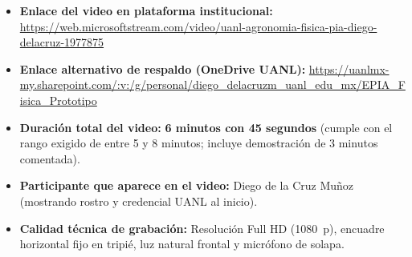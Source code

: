 \begin{tcolorbox}[colback=tableblue,colframe=uanlblue,title=\textbf{Ficha Técnica del Video de Evaluación},breakable]
\begin{itemize}
    \item \textbf{Enlace del video en plataforma institucional:} \newline
    \url{https://web.microsoftstream.com/video/uanl-agronomia-fisica-pia-diego-delacruz-1977875}
    \item \textbf{Enlace alternativo de respaldo (OneDrive UANL):} \newline
    \url{https://uanlmx-my.sharepoint.com/:v:/g/personal/diego_delacruzm_uanl_edu_mx/EPIA_Fisica_Prototipo}
    \item \textbf{Duración total del video:} \textbf{6 minutos con 45 segundos} (cumple con el rango exigido de entre 5 y 8 minutos; incluye demostración de 3 minutos comentada).
    \item \textbf{Participante que aparece en el video:} Diego de la Cruz Muñoz (mostrando rostro y credencial UANL al inicio).
    \item \textbf{Calidad técnica de grabación:} Resolución Full HD (\SI{1080}{p}), encuadre horizontal fijo en tripié, luz natural frontal y micrófono de solapa.
\end{itemize}
\end{tcolorbox}

